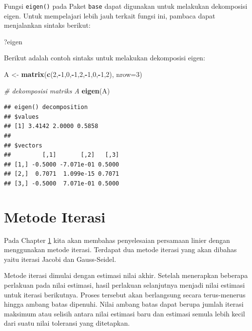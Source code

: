 \documentclass[
]{book}
\newenvironment{Shaded}{\begin{snugshade}}{\end{snugshade}}
\newcommand{\AttributeTok}[1]{\textcolor[rgb]{0.13,0.29,0.53}{#1}}
\newcommand{\CommentTok}[1]{\textcolor[rgb]{0.56,0.35,0.01}{\textit{#1}}}
\newcommand{\DecValTok}[1]{\textcolor[rgb]{0.00,0.00,0.81}{#1}}
\newcommand{\FunctionTok}[1]{\textcolor[rgb]{0.13,0.29,0.53}{\textbf{#1}}}
\newcommand{\NormalTok}[1]{#1}
\newcommand{\OtherTok}[1]{\textcolor[rgb]{0.56,0.35,0.01}{#1}}
\newcommand{\SpecialCharTok}[1]{\textcolor[rgb]{0.81,0.36,0.00}{\textbf{#1}}}
\theoremstyle{definition}
\theoremstyle{definition}
\theoremstyle{definition}
\theoremstyle{definition}
\theoremstyle{remark}
\begin{document}
Fungsi \texttt{eigen()} pada Paket \texttt{base} dapat digunakan untuk melakukan dekomposisi eigen. Untuk mempelajari lebih jauh terkait fungsi ini, pambaca dapat menjalankan sintaks berikut:

\begin{Shaded}
\begin{Highlighting}[]
\NormalTok{?eigen}
\end{Highlighting}
\end{Shaded}

Berikut adalah contoh sintaks untuk melakukan dekomposisi eigen:

\begin{Shaded}
\begin{Highlighting}[]
\NormalTok{A }\OtherTok{\textless{}{-}} \FunctionTok{matrix}\NormalTok{(}\FunctionTok{c}\NormalTok{(}\DecValTok{2}\NormalTok{,}\SpecialCharTok{{-}}\DecValTok{1}\NormalTok{,}\DecValTok{0}\NormalTok{,}\SpecialCharTok{{-}}\DecValTok{1}\NormalTok{,}\DecValTok{2}\NormalTok{,}\SpecialCharTok{{-}}\DecValTok{1}\NormalTok{,}\DecValTok{0}\NormalTok{,}\SpecialCharTok{{-}}\DecValTok{1}\NormalTok{,}\DecValTok{2}\NormalTok{), }\AttributeTok{nrow=}\DecValTok{3}\NormalTok{)}

\CommentTok{\# dekomposisi matriks A}
\FunctionTok{eigen}\NormalTok{(A)}
\end{Highlighting}
\end{Shaded}

\begin{verbatim}
## eigen() decomposition
## $values
## [1] 3.4142 2.0000 0.5858
## 
## $vectors
##         [,1]       [,2]   [,3]
## [1,] -0.5000 -7.071e-01 0.5000
## [2,]  0.7071  1.099e-15 0.7071
## [3,] -0.5000  7.071e-01 0.5000
\end{verbatim}

\hypertarget{iteratif}{%
\section{Metode Iterasi}\label{iteratif}}

Pada Chapter \ref{iteratif} kita akan membahas penyelesaian persamaan linier dengan menggunakan metode iterasi. Terdapat dua metode iterasi yang akan dibahas yaitu iterasi Jacobi dan Gauss-Seidel.

Metode iterasi dimulai dengan estimasi nilai akhir. Setelah menerapkan beberapa perlakuan pada nilai estimasi, hasil perlakuan selanjutnya menjadi nilai estimasi untuk iterasi berikutnya. Proses tersebut akan berlangsung secara terus-menerus hingga ambang batas dipenuhi. Nilai ambang batas dapat berupa jumlah iterasi maksimum atau selisih antara nilai estimasi baru dan estimasi semula lebih kecil dari suatu nilai toleransi yang ditetapkan.
\end{document}
